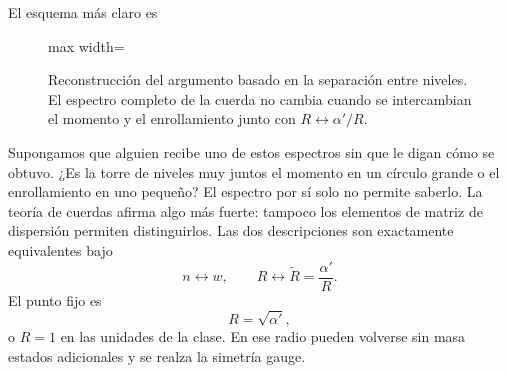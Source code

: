 El esquema más claro es
\begin{figure}[H]
  \centering
  \begin{adjustbox}{max width=\linewidth}
  \end{adjustbox}
  \caption{Reconstrucción del argumento basado en la separación entre niveles. El espectro completo de la cuerda no cambia cuando se intercambian el momento y el enrollamiento junto con \(R\leftrightarrow\alpha'/R\).}
  \label{fig:l10-dual-spectra-redraw}
\end{figure}

Supongamos que alguien recibe uno de estos espectros sin que le digan cómo se obtuvo. ¿Es la torre de niveles muy juntos el momento en un círculo grande o el enrollamiento en uno pequeño? El espectro por sí solo no permite saberlo. La teoría de cuerdas afirma algo más fuerte: tampoco los elementos de matriz de dispersión permiten distinguirlos. Las dos descripciones son exactamente equivalentes bajo
\begin{equation}
  n\longleftrightarrow w,
  \qquad
  R\longleftrightarrow \widetilde R=\frac{\alpha'}{R}.
  \label{eq:l10-radius-duality}
\end{equation}
El punto fijo es
\begin{equation}
  R=\sqrt{\alpha'},
  \label{eq:l10-self-dual-radius}
\end{equation}
o \(R=1\) en las unidades de la clase. En ese radio pueden volverse sin masa estados adicionales y se realza la simetría gauge.

